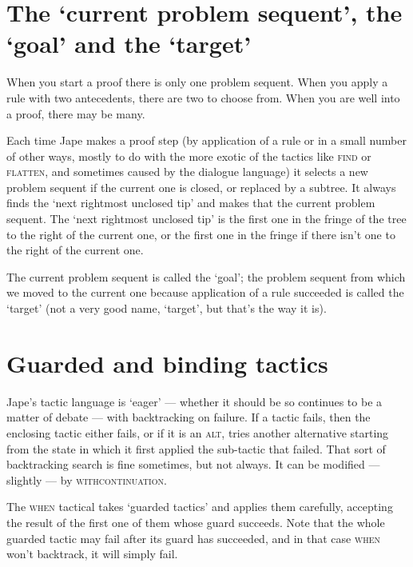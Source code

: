 \section{The `current problem sequent', the `goal' and the `target'}


When you start a proof there is only one problem sequent. When you apply a rule with two antecedents, there are two to choose from. When you are well into a proof, there may be many.


Each time Jape makes a proof step (by application of a rule or in a small number of other ways, mostly to do with the more exotic of the tactics like \textsc{find} or \textsc{flatten}, and sometimes caused by the dialogue language) it selects a new problem sequent if the current one is closed, or replaced by a subtree. It always finds the `next rightmost unclosed tip' and makes that the current problem sequent. The `next rightmost unclosed tip' is the first one in the fringe of the tree to the right of the current one, or the first one in the fringe if there isn't one to the right of the current one.


The current problem sequent is called the `goal'; the problem sequent from which we moved to the current one because application of a rule succeeded is called the `target' (not a very good name, `target', but that's the way it is).


\section{Guarded and binding tactics}


Jape's tactic language is `eager' --- whether it should be so continues to be a matter of debate --- with backtracking on failure. If a tactic fails, then the enclosing tactic either fails, or if it is an \textsc{alt}, tries another alternative starting from the state in which it first applied the sub-tactic that failed. That sort of backtracking search is fine sometimes, but not always. It can be modified --- slightly --- by \textsc{withcontinuation}.


The \textsc{when} tactical takes `guarded tactics' and applies them carefully, accepting the result of the first one of them whose guard succeeds. Note that the whole guarded tactic may fail after its guard has succeeded, and in that case \textsc{when} won't backtrack, it will simply fail.


